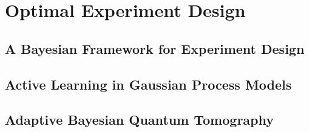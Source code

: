 \part{Optimal Experiment Design}

\chapter{A Bayesian Framework for Experiment Design}


\chapter{Active Learning in Gaussian Process Models}


\chapter{Adaptive Bayesian Quantum Tomography}

